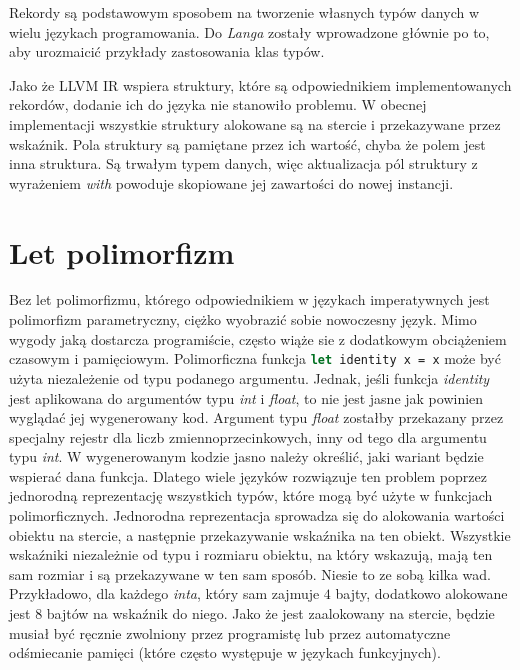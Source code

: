 \documentclass[declaration,shortabstract]{iithesis}
\begin{document}
Rekordy są podstawowym sposobem na tworzenie własnych typów danych w wielu 
językach programowania. Do \textit{Langa} zostały wprowadzone głównie po to, 
aby urozmaicić przykłady zastosowania klas typów. 

Jako że LLVM IR wspiera struktury, które są odpowiednikiem implementowanych 
rekordów, dodanie ich do języka nie stanowiło problemu. W obecnej 
implementacji 
wszystkie struktury alokowane są na stercie i przekazywane przez wskaźnik.
Pola struktury są pamiętane przez ich wartość, chyba że polem jest inna 
struktura. Są trwałym typem danych, więc aktualizacja pól struktury 
z wyrażeniem \textit{with} powoduje skopiowane jej zawartości do nowej 
instancji.

\section{Let polimorfizm}


Bez let polimorfizmu, którego odpowiednikiem w językach imperatywnych jest 
polimorfizm parametryczny, ciężko wyobrazić sobie nowoczesny język. 
Mimo wygody jaką dostarcza programiście, często wiąże sie z dodatkowym
obciążeniem czasowym i pamięciowym. Polimorficzna funkcja 
\lstinline[language=Caml]!let identity x = x! może być użyta niezależenie
od typu podanego argumentu. Jednak, jeśli funkcja \textit{identity} 
jest aplikowana do argumentów typu \textit{int} i \textit{float}, to nie jest 
jasne jak powinien wyglądać jej wygenerowany kod. Argument typu \textit{float}
zostałby przekazany przez specjalny rejestr dla liczb zmiennoprzecinkowych, 
inny od tego dla argumentu typu \textit{int}. W wygenerowanym kodzie jasno
należy określić, jaki wariant będzie wspierać dana funkcja. Dlatego wiele 
języków rozwiązuje ten problem poprzez jednorodną reprezentację wszystkich 
typów, które mogą być użyte w funkcjach polimorficznych. Jednorodna 
reprezentacja sprowadza się do alokowania wartości obiektu na stercie, a 
następnie przekazywanie wskaźnika na ten obiekt. Wszystkie wskaźniki 
niezależnie od typu i rozmiaru obiektu, na który wskazują, mają ten sam 
rozmiar i są przekazywane w ten sam sposób. Niesie to ze sobą kilka wad.
Przykładowo, dla każdego \textit{inta}, który sam zajmuje $4$ bajty,
dodatkowo alokowane jest $8$ bajtów na wskaźnik do niego. Jako że jest 
zaalokowany na stercie, będzie musiał być ręcznie zwolniony przez programistę 
lub przez automatyczne odśmiecanie pamięci (które często występuje w językach 
funkcyjnych).
\end{document}
